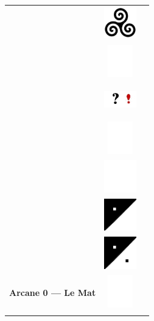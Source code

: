 \documentclass[11pt,oneside,a4paper]{article} %
\newcommand{\colornone}{ \includegraphics[width=1.40cm, height=1.40cm]{../../tarotData/img/color_none.jpg} }
\newcommand{\colorinte}{ \includegraphics[width=1.40cm, height=1.40cm]{../../tarotData/img/color_interrexclam.jpg} }
\newcommand{\tricurve}{ \includegraphics[width=1.40cm, height=1.40cm]{../img/tricurve.jpg} }
\newcommand{\partEmpt}{ \includegraphics[width=1.40cm, height=1.40cm]{../img/CountEmptyPart.png} }
\newcommand{\partHalf}{ \includegraphics[width=1.40cm, height=1.40cm]{../img/CountHalfPart.png} }
\newcommand{\partPlai}{ \includegraphics[width=1.40cm, height=1.40cm]{../img/CountPlainPart.png} }
\begin{document}
\setlength\parindent{0pt} %

\begin{longtable}[ht]{ c c c }

	\Ovalbox{%
		\begin{tabular}[ht]{ @{}m{4.50cm}@{} @{}p{1.50cm}@{} }
			\multirow{ 7 }{4.45cm}{ \includegraphics[width=4.45cm, height=9.00cm]{../../tarotData/img/0_Excuse_LeMat.jpg} \vfill } 
											&	\tricurve		\\
											&	\colornone		\\
											&	\colorinte		\\
											&	\colornone		\\
											&	\partEmpt		\\
											&	\partHalf		\\
											&	\partPlai		\\
			\hline
			\textbf{\footnotesize Arcane 0 --- Le Mat}		&	\colornone		\\
		\end{tabular}
	}	&
	\Ovalbox{%
		\begin{tabular}[ht]{ @{}m{4.50cm}@{} @{}p{1.50cm}@{} }
			\multirow{ 7 }{4.45cm}{ \includegraphics[width=4.45cm, height=9.00cm]{../../tarotData/img/1_LeBateleur_financial.png} \vfill } 

\end{tabular}}
\end{longtable}
\end{document}
